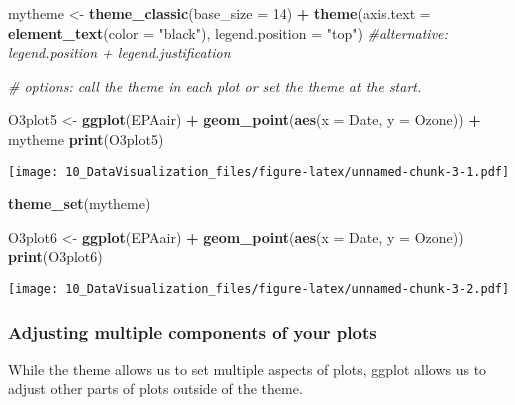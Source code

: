 \documentclass[]{article}
\newenvironment{Shaded}{\begin{snugshade}}{\end{snugshade}}
\newcommand{\KeywordTok}[1]{\textcolor[rgb]{0.13,0.29,0.53}{\textbf{#1}}}
\newcommand{\DataTypeTok}[1]{\textcolor[rgb]{0.13,0.29,0.53}{#1}}
\newcommand{\DecValTok}[1]{\textcolor[rgb]{0.00,0.00,0.81}{#1}}
\newcommand{\StringTok}[1]{\textcolor[rgb]{0.31,0.60,0.02}{#1}}
\newcommand{\CommentTok}[1]{\textcolor[rgb]{0.56,0.35,0.01}{\textit{#1}}}
\newcommand{\OperatorTok}[1]{\textcolor[rgb]{0.81,0.36,0.00}{\textbf{#1}}}
\newcommand{\NormalTok}[1]{#1}
\begin{document}
\begin{Shaded}
\begin{Highlighting}[]
\NormalTok{mytheme <-}\StringTok{ }\KeywordTok{theme_classic}\NormalTok{(}\DataTypeTok{base_size =} \DecValTok{14}\NormalTok{) }\OperatorTok{+}
\StringTok{  }\KeywordTok{theme}\NormalTok{(}\DataTypeTok{axis.text =} \KeywordTok{element_text}\NormalTok{(}\DataTypeTok{color =} \StringTok{"black"}\NormalTok{), }
        \DataTypeTok{legend.position =} \StringTok{"top"}\NormalTok{) }\CommentTok{#alternative: legend.position + legend.justification}

\CommentTok{# options: call the theme in each plot or set the theme at the start. }

\NormalTok{O3plot5 <-}\StringTok{ }\KeywordTok{ggplot}\NormalTok{(EPAair) }\OperatorTok{+}
\StringTok{  }\KeywordTok{geom_point}\NormalTok{(}\KeywordTok{aes}\NormalTok{(}\DataTypeTok{x =}\NormalTok{ Date, }\DataTypeTok{y =}\NormalTok{ Ozone)) }\OperatorTok{+}
\StringTok{  }\NormalTok{mytheme}
\KeywordTok{print}\NormalTok{(O3plot5)  }
\end{Highlighting}
\end{Shaded}

\texttt{[image: 10\_DataVisualization\_files/figure-latex/unnamed-chunk-3-1.pdf]}

\begin{Shaded}
\begin{Highlighting}[]
\KeywordTok{theme_set}\NormalTok{(mytheme)}

\NormalTok{O3plot6 <-}\StringTok{ }\KeywordTok{ggplot}\NormalTok{(EPAair) }\OperatorTok{+}
\StringTok{  }\KeywordTok{geom_point}\NormalTok{(}\KeywordTok{aes}\NormalTok{(}\DataTypeTok{x =}\NormalTok{ Date, }\DataTypeTok{y =}\NormalTok{ Ozone))}
\KeywordTok{print}\NormalTok{(O3plot6)  }
\end{Highlighting}
\end{Shaded}

\texttt{[image: 10\_DataVisualization\_files/figure-latex/unnamed-chunk-3-2.pdf]}

\subsubsection{Adjusting multiple components of your
plots}\label{adjusting-multiple-components-of-your-plots}

While the theme allows us to set multiple aspects of plots, ggplot
allows us to adjust other parts of plots outside of the theme.
\end{document}
